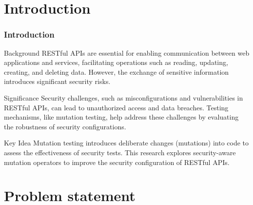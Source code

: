 \documentclass[12pt]{beamer}
\theoremstyle{remark}
\theoremstyle{definition}
\begin{document}
\section{Introduction}
\begin{frame}[allowframebreaks]
\frametitle{Introduction}
\begin{block}{Background}
RESTful APIs are essential for enabling communication between web applications and services, facilitating operations such as reading, updating, creating, and deleting data. However, the exchange of sensitive information introduces significant security risks.
\end{block}

\begin{block}{Significance}
Security challenges, such as misconfigurations and vulnerabilities in RESTful APIs, can lead to unauthorized access and data breaches. Testing mechanisms, like mutation testing, help address these challenges by evaluating the robustness of security configurations.
\end{block}

\begin{block}{Key Idea}
Mutation testing introduces deliberate changes (mutations) into code to assess the effectiveness of security tests. This research explores security-aware mutation operators to improve the security configuration of RESTful APIs.
\end{block}
\end{frame}

\section{Problem statement}
\end{document}
